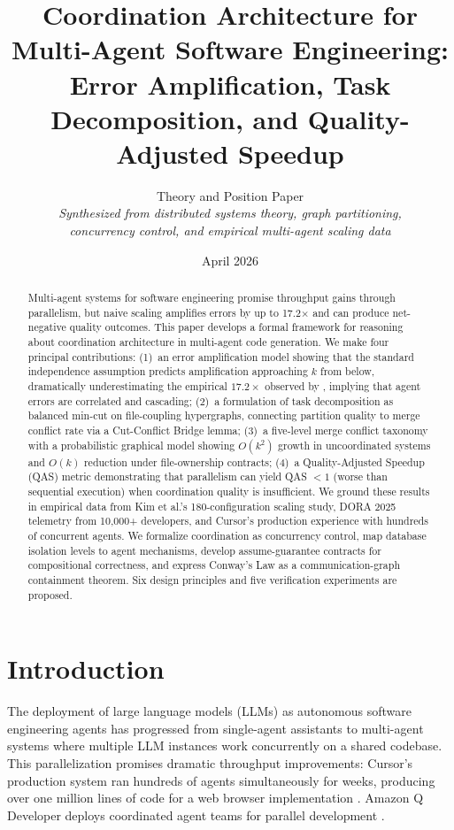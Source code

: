 \documentclass[11pt]{article}
\title{Coordination Architecture for Multi-Agent Software Engineering:\\
  Error Amplification, Task Decomposition, and Quality-Adjusted Speedup}
\author{
  Theory and Position Paper\\[6pt]
  \textit{Synthesized from distributed systems theory, graph partitioning,}\\
  \textit{concurrency control, and empirical multi-agent scaling data}
}
\date{April 2026}
\theoremstyle{definition}
\theoremstyle{remark}
\begin{document}
\maketitle

\begin{abstract}
Multi-agent systems for software engineering promise throughput gains through parallelism, but naive scaling amplifies errors by up to 17.2$\times$ and can produce net-negative quality outcomes.
This paper develops a formal framework for reasoning about coordination architecture in multi-agent code generation.
We make four principal contributions:
(1)~an error amplification model showing that the standard independence assumption predicts amplification approaching $k$ from below, dramatically underestimating the empirical $17.2\times$ observed by \citet{Kim2025}, implying that agent errors are correlated and cascading;
(2)~a formulation of task decomposition as balanced min-cut on file-coupling hypergraphs, connecting partition quality to merge conflict rate via a Cut-Conflict Bridge lemma;
(3)~a five-level merge conflict taxonomy with a probabilistic graphical model showing $O(k^2)$ growth in uncoordinated systems and $O(k)$ reduction under file-ownership contracts;
(4)~a Quality-Adjusted Speedup (QAS) metric demonstrating that parallelism can yield QAS $< 1$ (worse than sequential execution) when coordination quality is insufficient.
We ground these results in empirical data from Kim et al.'s 180-configuration scaling study, DORA 2025 telemetry from 10,000+ developers, and Cursor's production experience with hundreds of concurrent agents.
We formalize coordination as concurrency control, map database isolation levels to agent mechanisms, develop assume-guarantee contracts for compositional correctness, and express Conway's Law as a communication-graph containment theorem.
Six design principles and five verification experiments are proposed.
\end{abstract}

\section{Introduction}
\label{sec:intro}

The deployment of large language models (LLMs) as autonomous software engineering agents has progressed from single-agent assistants to multi-agent systems where multiple LLM instances work concurrently on a shared codebase.
This parallelization promises dramatic throughput improvements: Cursor's production system ran hundreds of agents simultaneously for weeks, producing over one million lines of code for a web browser implementation \citep{Cursor2026}.
Amazon Q Developer deploys coordinated agent teams for parallel development \citep{Osmani2025}.
\end{document}
